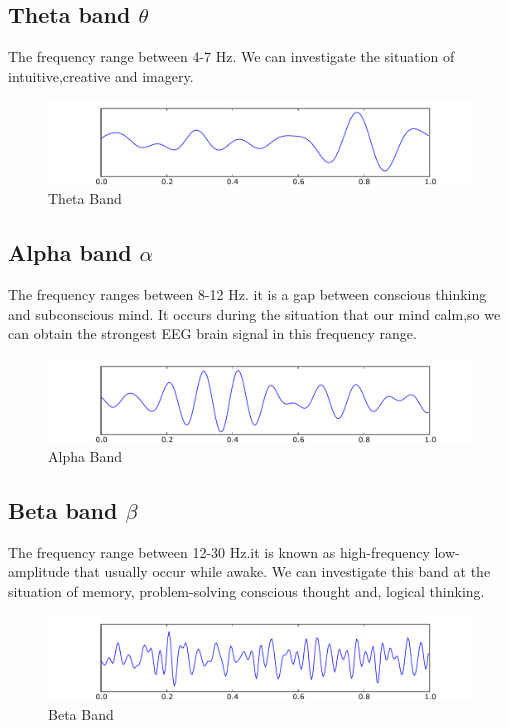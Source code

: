 \subsection{Theta band $\theta$} 
\hspace{1.5cm} The frequency range between 4-7 Hz. We can investigate the situation of intuitive,creative and imagery. 
\begin{figure}[ht]
	\centering
	\includegraphics[scale = 0.5]{chapter3/Eeg_theta.pdf}
	\caption{Theta Band}
\end{figure}

\subsection{Alpha band $\alpha$} 
\hspace{1.5cm} The frequency ranges between 8-12 Hz. it is a gap between conscious thinking and subconscious mind. It occurs during the situation that our mind calm,so we can obtain the strongest EEG brain signal in this frequency range.
\begin{figure}[ht]
	\centering
	\includegraphics[scale = 0.5]{chapter3/Eeg_alpha.pdf}
	\caption{Alpha Band}
\end{figure}

\subsection{Beta band $\beta$} 
\hspace{1.5cm} The frequency range between 12-30 Hz.it is known as high-frequency low-amplitude that usually occur while awake. We can investigate this band at the situation of memory, problem-solving conscious thought and, logical thinking. 
\begin{figure}[ht]
	\centering
	\includegraphics[scale = 0.5]{chapter3/Eeg_beta.pdf}
	\caption{Beta Band}
\end{figure}


